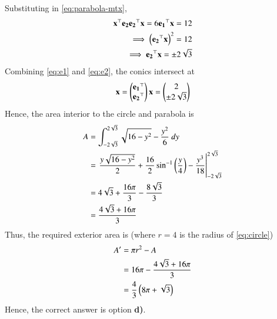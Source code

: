 \documentclass[journal,12pt,twocolumn]{IEEEtran}
\begin{document}
\begin{enumerate}
    Substituting in \eqref{eq:parabola-mtx},
    \begin{align}
        \mathbf{x}^\top\mathbf{e_2e_2}^\top\mathbf{x} = 6\mathbf{e_1}^\top\mathbf{x} = 12 \\
        \implies \left(\mathbf{e_2}^\top\mathbf{x}\right)^2 = 12 \\
        \implies \mathbf{e_2}^\top\mathbf{x} = \pm 2\sqrt{3} \label{eq:e2}
    \end{align}
    Combining \eqref{eq:e1} and \eqref{eq:e2}, the conics intersect at
    \begin{align}
        \mathbf{x} = \begin{pmatrix}\mathbf{e_1}^\top\\\mathbf{e_2}^\top\end{pmatrix}\mathbf{x} = \begin{pmatrix}2\\\pm 2\sqrt{3}\end{pmatrix}
    \end{align}
    Hence, the area interior to the circle and parabola is
    \begin{align}
        A &= \int_{-2\sqrt{3}}^{2\sqrt{3}}\sqrt{16-y^2}-\frac{y^2}{6}\ dy \\
          &= \left.\frac{y\sqrt{16-y^2}}{2}+\frac{16}{2}\sin^{-1}\left(\frac{y}{4}\right)-\frac{y^3}{18}\right\vert_{-2\sqrt{3}}^{2\sqrt{3}} \\
          &= 4\sqrt{3}+\frac{16\pi}{3}-\frac{8\sqrt{3}}{3} \\
          &= \frac{4\sqrt{3}+16\pi}{3}
          \label{eq:area-interior}
    \end{align}
    Thus, the required exterior area is (where $r = 4$ is the radius of 
    \eqref{eq:circle})
    \begin{align}
        A' &= \pi r^2 - A \\
           &= 16\pi - \frac{4\sqrt{3}+16\pi}{3} \\
           &= \frac{4}{3}\left(8\pi+\sqrt{3}\right)
           \label{eq:area-exterior}
    \end{align}
    Hence, the correct answer is option \textbf{d)}.


\end{enumerate}
\end{document}
